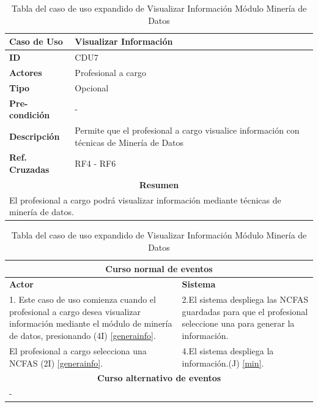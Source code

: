 \begin{table}
	\centering
	\begin{tabular}{|p{6cm} |p{6cm}|}
		\hline \textbf{Caso de Uso} & Visualizar Información \\ 
		\hline \textbf{ID} & CDU7 \\ 
		\hline \textbf{Actores} & Profesional a cargo \\ 
		\hline \textbf{Tipo} & Opcional \\ 
		\hline \textbf{Pre-condición} & - \\ 
		\hline \textbf{Descripción} & Permite que el profesional a cargo visualice información con técnicas de Minería de Datos \\
		\hline \textbf{Ref. Cruzadas} & RF4 - RF6 \\ 
		\hline
		\multicolumn{2}{|c|}{\textbf{Resumen}} \\
		\hline
		\multicolumn{2}{|p{12cm}|}{El profesional a cargo podrá visualizar información mediante técnicas de minería de datos.} \\
		\hline 
	\end{tabular}  
	\begin{tabular}{|p{6cm}|p{6cm}|}
		\multicolumn{2}{|c|}{\textbf{Curso normal de eventos}} \\
		\hline \textbf{Actor} & \textbf{Sistema} \\ 
		\hline 1. Este caso de uso comienza cuando el profesional a cargo desea visualizar información mediante el módulo de minería de datos, presionando (4I) \ref{generainfo}. & 2.El sistema despliega las NCFAS guardadas para que el profesional seleccione una para generar la información.  \\ 
	El profesional a cargo selecciona una NCFAS (2I) \ref{generainfo}. & 4.El sistema despliega la información.(J) \ref{min}. \\
		\hline
		\multicolumn{2}{|c|}{\textbf{Curso alternativo de eventos}} \\
		\hline
		\multicolumn{2}{|p{12cm}|}{ - } \\
		\hline
	\end{tabular}
	\caption{Tabla del caso de uso expandido de Visualizar Información Módulo Minería de Datos}
	\label{tabcdu77}
\end{table}
\clearpage


